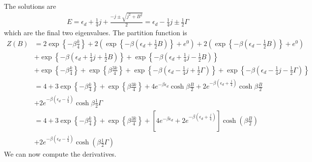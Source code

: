 \documentclass[12pt,twoside]{report}
\numberwithin{equation}{section}
\begin{document}
The solutions are
\begin{equation}\begin{aligned}
	E = \epsilon_d + \frac{1}{4}j + \frac{-j \pm \sqrt{j^2 + B^2}}{2} = \epsilon_d - \frac{1}{4}j \pm \frac{1}{2}\Gamma
\end{aligned}\end{equation}
which are the final two eigenvalues.
\pb The partition function is
\begin{equation}\begin{aligned}
	Z(B) &= 2 \exp\left\{-\beta \frac{k}{4}\right\} + 2\left( \exp\left\{-\beta\left(\epsilon_d + \frac{1}{2} B\right)\right\} + e^0\right) + 2\left( \exp\left\{-\beta\left(\epsilon_d - \frac{1}{2} B\right)\right\} + e^0\right) \\
	     &+ \exp\left\{-\beta\left(\epsilon_d + \frac{1}{4}j + \frac{1}{2} B\right)\right\} + \exp\left\{-\beta\left(\epsilon_d + \frac{1}{4}j - \frac{1}{2} B\right)\right\} \\
	     &+ \exp\left\{-\beta \frac{k}{4}\right\} + \exp\left\{\beta \frac{3k}{4}\right\} + \exp\left\{-\beta\left(\epsilon_d - \frac{1}{4}j + \frac{1}{2}\Gamma\right)\right\} + \exp\left\{-\beta\left( \epsilon_d- \frac{1}{4}j - \frac{1}{2}\Gamma\right)\right\}\\
	     &= 4 + 3\exp\left\{-\beta \frac{k}{4}\right\} + \exp\left\{\beta \frac{3k}{4}\right\} + 4e^{-\beta \epsilon_d}\cosh \beta \frac{B}{2} + 2e^{-\beta \left(\epsilon_d + \frac{j}{4}\right)}\cosh \beta \frac{B}{2}\\
	     &+ 2e^{-\beta\left(\epsilon_d - \frac{j}{4}\right)}\cosh \beta \frac{1}{2}\Gamma\\
	     &= 4 + 3\exp\left\{-\beta \frac{k}{4}\right\} + \exp\left\{\beta \frac{3k}{4}\right\} + \left[4e^{-\beta \epsilon_d} + 2e^{-\beta \left(\epsilon_d + \frac{j}{4}\right)}\right]\cosh \left(\beta \frac{B}{2}\right) \\
	     &+ 2e^{-\beta\left(\epsilon_d - \frac{j}{4}\right)}\cosh \left(\beta \frac{1}{2}\Gamma\right)
\end{aligned}\end{equation}
We can now compute the derivatives.
\end{document}
